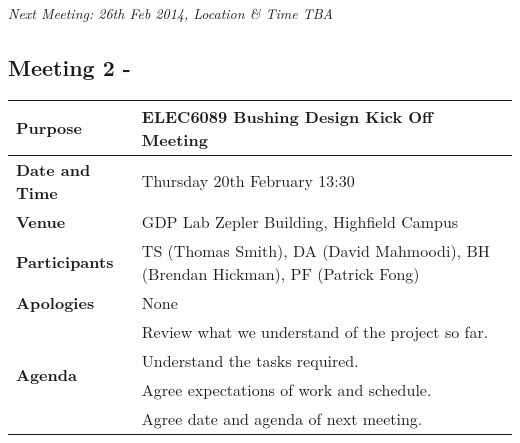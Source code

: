 \emph{Next Meeting: 26th Feb 2014, Location \& Time TBA}


\subsection{Meeting 2 - }
\begin{center}
\begin{longtable}{| m{} | m{} |} \hline
\textbf{Purpose} & ELEC6089 Bushing Design Kick Off Meeting \\ \hline
\textbf{Date and Time} & Thursday 20th February 13:30 \\ \hline
\textbf{Venue} & GDP Lab Zepler Building, Highfield Campus \\ \hline
\textbf{Participants} & TS (Thomas Smith), DA (David Mahmoodi), BH (Brendan Hickman), PF (Patrick Fong)\\ \hline
\textbf{Apologies} &None \\ \hline
\multirow{4}{*}{\textbf{Agenda}} & Review what we understand of the project so far. \\
 & Understand the tasks required. \\ 
 & Agree expectations of work and schedule. \\
 & Agree date and agenda of next meeting. \\ \hline
\end{longtable}
\end{center}

